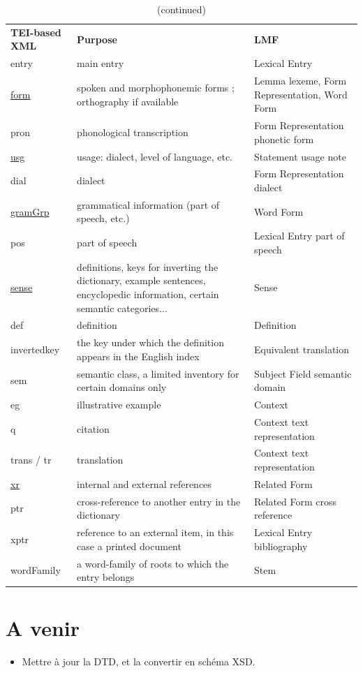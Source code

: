 \documentclass[a4paper,12pt]{article}
\begin{document}
\begin{center}
\begin{longtable}{|p{4cm}|p{5cm}|p{6cm}|}
\caption[]{Limbu dictionary: matching between XML and LMF} \\ \hline
\endfirsthead
\caption[]{(continued)} \\
\endhead
\endfoot
\endlastfoot
\textbf{TEI-based XML} & \textbf{Purpose} & \textbf{LMF} \\ \hline
entry & main entry & Lexical Entry \\ \hline\hline
\underline{form} & spoken and morphophonemic forms ; orthography if available & Lemma lexeme, Form Representation, Word Form\\ \hline
pron & phonological transcription & Form Representation phonetic form \\ \hline\hline
\underline{usg} & usage: dialect, level of language, etc. & Statement usage note \\ \hline
dial & dialect &  Form Representation dialect \\ \hline\hline
\underline{gramGrp} & grammatical information (part of speech, etc.) & Word Form \\ \hline
pos & part of speech & Lexical Entry part of speech \\ \hline\hline
\underline{sense} & definitions, keys for inverting the dictionary, example sentences, encyclopedic information, certain semantic categories... & Sense \\ \hline
def & definition & Definition \\ \hline
invertedkey & the key under which the definition appears in the English index & Equivalent translation \\ \hline
sem & semantic class, a limited inventory for certain domains only & Subject Field semantic domain \\ \hline
eg & illustrative example & Context \\ \hline
q & citation & Context text representation \\ \hline
trans / tr & translation & Context text representation \\ \hline\hline
\underline{xr} & internal and external references & Related Form \\ \hline
ptr & cross-reference to another entry in the dictionary & Related Form cross reference \\ \hline
xptr & reference to an external item, in this case a printed document & Lexical Entry bibliography \\ \hline
wordFamily & a word-family of roots to which the entry belongs & Stem \\ \hline
\end{longtable}
\end{center}

\section{A venir}

\begin{itemize}
\item Mettre \`a jour la DTD, et la convertir en sch\'ema XSD.
\end{itemize}
\end{document}
